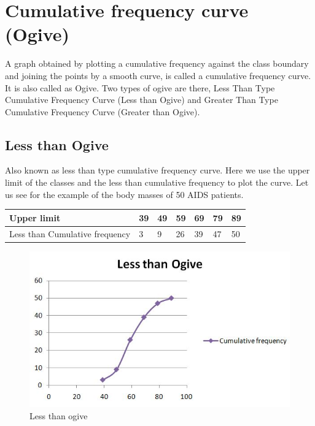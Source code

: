 \documentclass[
]{book}
\begin{document}
\hypertarget{cumulative-frequency-curve-ogive}{%
\section{Cumulative frequency curve (Ogive)}\label{cumulative-frequency-curve-ogive}}

A graph obtained by plotting a cumulative frequency against the class boundary and joining the points by a smooth curve, is called a cumulative frequency curve. It is also called as Ogive. Two types of ogive are there, Less Than Type Cumulative Frequency Curve (Less than Ogive) and Greater Than Type Cumulative Frequency Curve (Greater than Ogive).

\hypertarget{less-than-ogive}{%
\subsection{Less than Ogive}\label{less-than-ogive}}

Also known as less than type cumulative frequency curve. Here we use the upper limit of the classes and the less than cumulative frequency to plot the curve. Let us see for the example of the body masses of 50 AIDS patients.

\begin{longtable}[]{@{}lllllll@{}}
\toprule
Upper limit & 39 & 49 & 59 & 69 & 79 & 89 \\
\midrule
\endhead
Less than Cumulative frequency & 3 & 9 & 26 & 39 & 47 & 50 \\
\bottomrule
\end{longtable}

\begin{figure}

{\centering \includegraphics[width=0.7\linewidth]{images/image9} 

}

\caption{Less than ogive}\label{fig:lto}
\end{figure}
\end{document}
